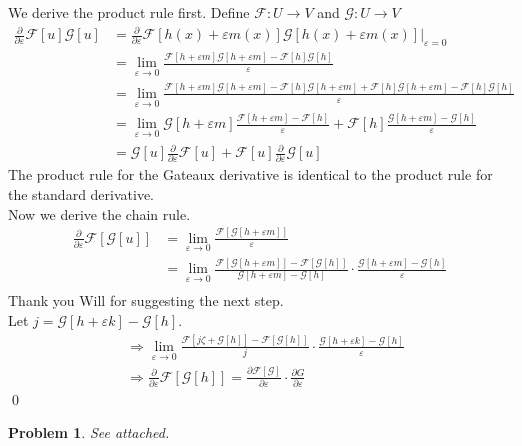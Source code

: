 \documentclass[12pt]{article}
\newtheorem{problem}{Problem}
\begin{document}
We derive the product rule first.
Define $\mathcal{F}: U \rightarrow V$ and $\mathcal{G}: U \rightarrow V$
\begin{align*}
    \frac{\partial}{\partial \varepsilon} \mathcal{F}[u] \mathcal{G}[u] & = \frac{\partial}{\partial \varepsilon} \mathcal{F}[h(x) + \varepsilon m(x)] \mathcal{G}[h(x) + \varepsilon m(x)] \bigg|_{\varepsilon = 0} \\
    & = \lim_{\varepsilon \to 0} \frac{\mathcal{F}[h + \varepsilon m]\mathcal{G}[h + \varepsilon m] - \mathcal{F}[h]\mathcal{G}[h]}{\varepsilon} \\
    & = \lim_{\varepsilon \to 0} \frac{\mathcal{F}[h + \varepsilon m]\mathcal{G}[h + \varepsilon m] - \mathcal{F}[h]\mathcal{G}[h+\varepsilon m] + \mathcal{F}[h]\mathcal{G}[h+\varepsilon m] - \mathcal{F}[h]\mathcal{G}[h]}{\varepsilon} \\
    & = \lim_{\varepsilon \to 0} \mathcal{G}[h + \varepsilon m] \frac{\mathcal{F}[h+\varepsilon m] - \mathcal{F}[h]}{\varepsilon} + \mathcal{F}[h] \frac{\mathcal{G}[h+\varepsilon m] - \mathcal{G}[h]}{\varepsilon} \\
    & = \mathcal{G}[u] \frac{\partial}{\partial \varepsilon}\mathcal{F}[u] + \mathcal{F}[u] \frac{\partial}{\partial \varepsilon}\mathcal{G}[u]
\end{align*}
The product rule for the Gateaux derivative is identical to the product rule for the standard derivative.\\

Now we derive the chain rule.
\begin{align*}
\frac{\partial}{\partial \varepsilon} \mathcal{F}[\mathcal{G}[u]] 
& = \lim_{\varepsilon \to 0}\frac{\mathcal{F}[\mathcal{G}[h+\varepsilon m]]}{\varepsilon} \\
& = \lim_{\varepsilon \to 0}
\frac{\mathcal{F}[\mathcal{G}[h+\varepsilon m]]-\mathcal{F}[\mathcal{G}[h]]}{\mathcal{G}[h+\varepsilon m] - \mathcal{G}[h]} \cdot \frac{\mathcal{G}[h+\varepsilon m] - \mathcal{G}[h]}{\varepsilon}  \\
\end{align*}
Thank you Will for suggesting the next step.\\
Let $j = \mathcal{G}[h + \varepsilon k] - \mathcal{G}[h]$.
\begin{align*}
    & \Rightarrow \lim_{\varepsilon \to 0} \frac{\mathcal{F}[j \zeta + \mathcal{G}[h]] - \mathcal{F}[\mathcal{G}[h]]}{j} \cdot \frac{\mathcal{G}[h+\varepsilon k] - \mathcal{G}[h]}{\varepsilon} \\
    & \Rightarrow \frac{\partial}{\partial \varepsilon}\mathcal{F}[\mathcal{G}[h]] = \frac{\partial\mathcal{F}[\mathcal{G}]}{\partial \varepsilon} \cdot \frac{\partial G}{\partial \varepsilon} 
\end{align*}
\qed
\newpage 
\begin{problem}
See attached.
\end{problem}

 
\end{document}
